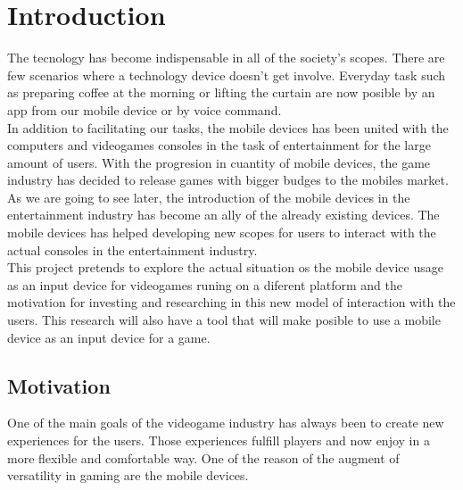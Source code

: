 




\chapter*{Introduction}


The tecnology has become indispensable in all of the society's scopes. There are few scenarios where a technology device doesn't get involve. Everyday task such as preparing coffee at the morning or lifting the curtain are now posible by an app from our mobile device or by voice command.\\

In addition to facilitating our tasks, the mobile devices has been united with the computers and videogames consoles in the task of entertainment for the large amount of users. With the progresion in cuantity of mobile devices, the game industry has decided to release games with bigger budges to the mobiles market.\\

As we are going to see later, the introduction of the mobile devices in the entertainment industry has become an ally of the already existing devices. The mobile devices has helped developing new scopes for users to interact with the actual consoles in the entertainment industry.\\

This project pretends to explore the actual situation os the mobile device usage as an input device for videogames runing on a diferent platform and the motivation for investing and researching in this new model of interaction with the users. This research will also have a tool that will make posible to use a mobile device as an input device for a game.\\

\section*{Motivation}


One of the main goals of the videogame industry has always been to create new experiences for the users. Those experiences fulfill players and now enjoy in a more flexible and comfortable way. One of the reason of the augment of versatility in gaming are the mobile devices.\\

